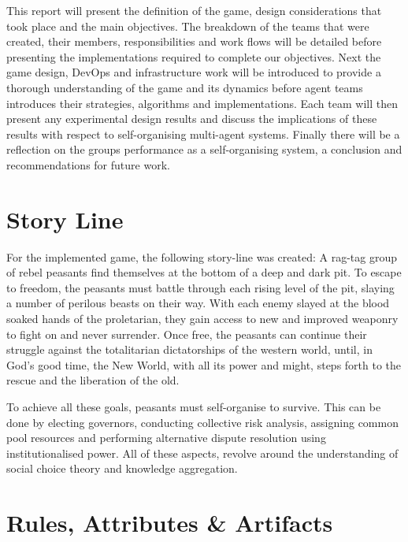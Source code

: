This report will present the definition of the game, design considerations that took place and the main objectives. The breakdown of the teams that were created, their members, responsibilities and work flows will be detailed before presenting the implementations required to complete our objectives. Next the game design, DevOps and infrastructure work will be introduced to provide a thorough understanding of the game and its dynamics before agent teams introduces their strategies, algorithms and implementations. Each team will then present any experimental design results and discuss the implications of these results with respect to self-organising multi-agent systems. Finally there will be a reflection on the groups performance as a self-organising system, a conclusion and recommendations for future work. 

\section{Story Line}\label{sec:story line}

For the implemented game, the following story-line was created: A rag-tag group of rebel peasants find themselves at the bottom of a deep and dark pit. To escape to freedom, the peasants must battle through each rising level of the pit, slaying a number of perilous beasts on their way. With each enemy slayed at the blood soaked hands of the proletarian, they gain access to new and improved weaponry to fight on and never surrender. Once free, the peasants can continue their struggle against the totalitarian dictatorships of the western world, until, in God's good time, the New World, with all its power and might, steps forth to the rescue and the liberation of the old. \cite{churchill} 

To achieve all these goals, peasants must self-organise to survive. This can be done by electing governors, conducting collective risk analysis, assigning common pool resources and performing alternative dispute resolution using institutionalised power. All of these aspects, revolve around the understanding of social choice theory and knowledge aggregation. 


\section{Rules, Attributes \& Artifacts}\label{sec:rules}

